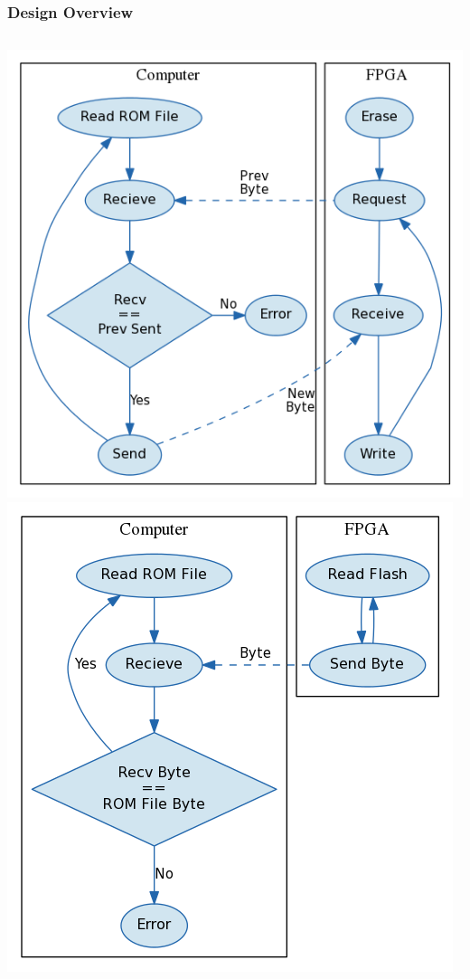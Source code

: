 \documentclass[xcolor=table]{beamer}
\begin{document}
\begin{frame}
    \frametitle{Design Overview}
    \begin{columns}[c]
        \includegraphics[width=\textwidth]{../../fpga/rom_flasher/doc/block_diagram_write.png}
        \includegraphics[width=\textwidth]{../../fpga/rom_flasher/doc/block_diagram_read.png}
    \end{columns}
\end{frame}
\end{document}
